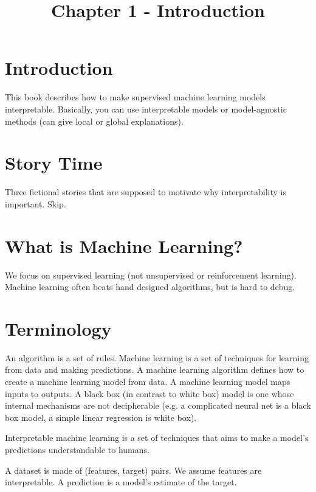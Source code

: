 \documentclass[a4paper]{article}
\title{Chapter 1 - Introduction}
\date{}
\begin{document}
\maketitle

\section{Introduction}
This book describes how to make supervised machine learning models
interpretable. Basically, you can use interpretable models or model-agnostic
methods (can give local or global explanations).

\section{Story Time}
Three fictional stories that are supposed to motivate why interpretability is
important. Skip.

\section{What is Machine Learning?}
We focus on supervised learning (not unsupervised or reinforcement learning).
Machine learning often beats hand designed algorithms, but is hard to debug.

\section{Terminology}
An algorithm is a set of rules. Machine learning is a set of techniques for
learning from data and making predictions. A machine learning algorithm
defines how to create a machine learning model from data. A machine learning
model maps inputs to outputs. A black box (in contrast to white box) model is
one whose internal mechanisms are not decipherable (e.g. a complicated
neural net is a black box model, a simple linear regression is white box).

Interpretable machine learning is a set of techniques that aims to make a
model's predictions understandable to humans.

A dataset is made of (features, target) pairs. We assume features are
interpretable. A prediction is a model's estimate of the target.
\end{document}
